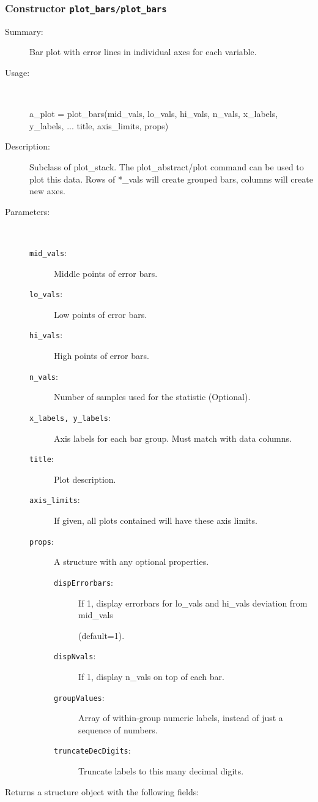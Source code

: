 \subsubsection[Constructor \texttt{plot\_bars}]{Constructor \texttt{plot\_bars/plot\_bars}}%
%
\label{ref_plot_bars__plot_bars}%
\hypertarget{ref_plot_bars__plot_bars}{}%
\begin{description}
\item[Summary:]Bar plot with error lines in individual axes for each variable.
%
\item[Usage:]~%
\begin{lyxcode}%
a\_plot = plot\_bars(mid\_vals, lo\_vals, hi\_vals, n\_vals, x\_labels, y\_labels, ...
		     title, axis\_limits, props)
%
\end{lyxcode}%
%
\item[Description:]%
Subclass of plot\_stack. The plot\_abstract/plot command can be used to
 plot this data. Rows of *\_vals will create grouped bars, columns will
 create new axes.
\item[Parameters:]~
\begin{description}%
\item[\texttt{mid\_vals}:]
 Middle points of error bars.
\item[\texttt{lo\_vals}:]
 Low points of error bars.
\item[\texttt{hi\_vals}:]
 High points of error bars.
\item[\texttt{n\_vals}:]
 Number of samples used for the statistic (Optional).
\item[\texttt{x\_labels, y\_labels}:]
 Axis labels for each bar group. Must match with data columns.
\item[\texttt{title}:]
 Plot description.
\item[\texttt{axis\_limits}:]
 If given, all plots contained will have these axis limits.
\item[\texttt{props}:]
 A structure with any optional properties.
\begin{description}%
\item[\texttt{dispErrorbars}:]
 If 1, display errorbars for lo\_vals and hi\_vals deviation from mid\_vals 

(default=1).\item[\texttt{dispNvals}:]
 If 1, display n\_vals on top of each bar.
\item[\texttt{groupValues}:]
 Array of within-group numeric labels, instead of just a sequence of numbers.
\item[\texttt{truncateDecDigits}:]
 Truncate labels to this many decimal digits.
\end{description}%
\end{description}%
%
\item[Returns a structure object with the following fields:]~


\end{description}
